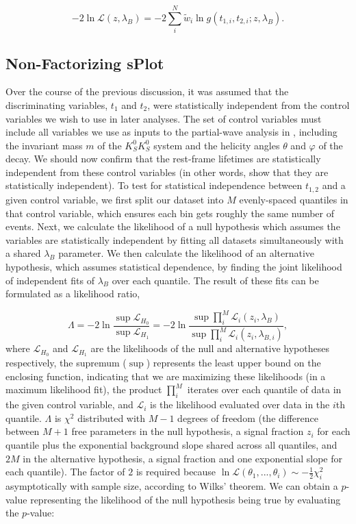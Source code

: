 \begin{equation}
  -2\ln\mathcal{L}(z,  \lambda_B) = -2\sum_i^N \tilde{w}_i \ln g(t_{1,i}, t_{2,i}; z, \lambda_B).
  \label{eq:splot-nll}
\end{equation}

\subsection{Non-Factorizing sPlot}\label{sec:non-factorizing-splot}

Over the course of the previous discussion, it was assumed that the discriminating variables, $t_1$ and $t_2$, were statistically independent from the control variables we wish to use in later analyses. The set of control variables must include all variables we use as inputs to the partial-wave analysis in , including the invariant mass $m$ of the $K_S^0K_S^0$ system and the helicity angles $\theta$ and $\varphi$ of the decay. We should now confirm that the rest-frame lifetimes are statistically independent from these control variables (in other words, show that they are statistically independent). To test for statistical independence between $t_{1,2}$ and a given control variable, we first split our dataset into $M$ evenly-spaced quantiles in that control variable, which ensures each bin gets roughly the same number of events. Next, we calculate the likelihood of a null hypothesis which assumes the variables are statistically independent by fitting all datasets simultaneously with a shared $\lambda_B$ parameter. We then calculate the likelihood of an alternative hypothesis, which assumes statistical dependence, by finding the joint likelihood of independent fits of $\lambda_B$ over each quantile. The result of these fits can be formulated as a likelihood ratio,

\begin{equation}
  \Lambda = -2\ln\frac{\sup \mathcal{L}_{H_0}}{\sup \mathcal{L}_{H_1}} = -2\ln\frac{\sup \prod_i^M \mathcal{L}_i(z_i, \lambda_B)}{\sup \prod_i^M \mathcal{L}_i(z_i, \lambda_{B,i})},
  \label{eq:independence-test}
\end{equation}
where $\mathcal{L}_{H_0}$ and $\mathcal{L}_{H_1}$ are the likelihoods of the null and alternative hypotheses respectively, the supremum ($\sup$) represents the least upper bound on the enclosing function, indicating that we are maximizing these likelihoods (in a maximum likelihood fit), the product $\prod_i^M$ iterates over each quantile of data in the given control variable, and $\mathcal{L}_i$ is the likelihood evaluated over data in the $i$th quantile. $\Lambda$ is $\chi^2$ distributed with $M - 1$ degrees of freedom (the difference between $M + 1$ free parameters in the null hypothesis, a signal fraction $z_i$ for each quantile plus the exponential background slope shared across all quantiles, and $2M$ in the alternative hypothesis, a signal fraction and one exponential slope for each quantile). The factor of $2$ is required because $\ln\mathcal{L}(\theta_1,...,\theta_i) \sim -\frac{1}{2}\chi^2_i$ asymptotically with sample size, according to Wilks' theorem. We can obtain a $p$-value representing the likelihood of the null hypothesis being true by evaluating the $p$-value:

